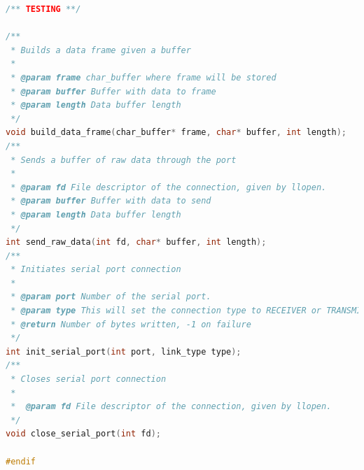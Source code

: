 \documentclass[11pt]{article}
\begin{document}
\begin{lstlisting}[language=C]
/** TESTING **/

/**
 * Builds a data frame given a buffer
 *
 * @param frame char_buffer where frame will be stored
 * @param buffer Buffer with data to frame
 * @param length Data buffer length
 */
void build_data_frame(char_buffer* frame, char* buffer, int length);
/**
 * Sends a buffer of raw data through the port
 *
 * @param fd File descriptor of the connection, given by llopen.
 * @param buffer Buffer with data to send
 * @param length Data buffer length
 */
int send_raw_data(int fd, char* buffer, int length);
/**
 * Initiates serial port connection
 *
 * @param port Number of the serial port.
 * @param type This will set the connection type to RECEIVER or TRANSMITTER
 * @return Number of bytes written, -1 on failure
 */
int init_serial_port(int port, link_type type);
/**
 * Closes serial port connection
 *
 *  @param fd File descriptor of the connection, given by llopen.
 */
void close_serial_port(int fd);

#endif


\end{lstlisting}
\end{document}
